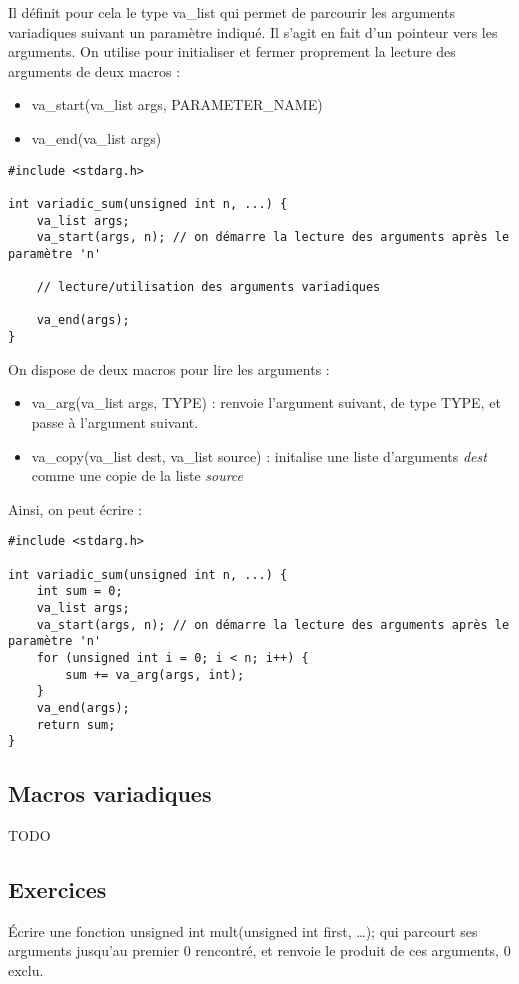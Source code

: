 \documentclass[../../../main.tex]{subfiles}
\begin{document}
Il définit pour cela le type \textsf{va\_list} qui permet de parcourir les arguments variadiques suivant un paramètre indiqué. Il s'agit en fait d'un pointeur vers les arguments. On utilise pour initialiser et fermer proprement la lecture des arguments de deux macros :
\begin{itemize}
	\item \textsf{va\_start(va\_list args, PARAMETER\_NAME)}
	\item \textsf{va\_end(va\_list args)}
\end{itemize}
\begin{verbatim}
#include <stdarg.h>

int variadic_sum(unsigned int n, ...) {
	va_list args;
	va_start(args, n); // on démarre la lecture des arguments après le paramètre 'n'

	// lecture/utilisation des arguments variadiques

	va_end(args);
}
\end{verbatim}
On dispose de deux macros pour lire les arguments :
\begin{itemize}
	\item \textsf{va\_arg(va\_list args, TYPE)} : renvoie l'argument suivant, de type \textsf{TYPE}, et passe à l'argument suivant. 
	\item \textsf{va\_copy(va\_list dest, va\_list source)} : initalise une liste d'arguments \textit{dest} comme une copie de la liste \textit{source}
\end{itemize}
Ainsi, on peut écrire :
\begin{verbatim}
#include <stdarg.h>

int variadic_sum(unsigned int n, ...) {
	int sum = 0;
	va_list args;
	va_start(args, n); // on démarre la lecture des arguments après le paramètre 'n'
	for (unsigned int i = 0; i < n; i++) {
		sum += va_arg(args, int);
	}
	va_end(args);
	return sum;
}
\end{verbatim}
\subsection{Macros variadiques}
TODO
\subsection{Exercices}
 Écrire une fonction \textsf{unsigned int mult(unsigned int first, \dots);} qui parcourt ses arguments jusqu'au premier 0 rencontré, et renvoie le produit de ces arguments, 0 exclu.
\end{document}
